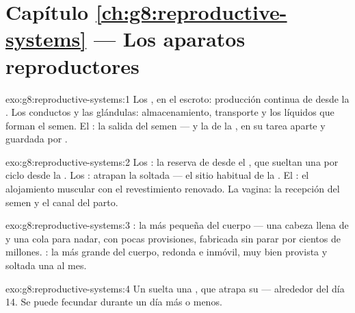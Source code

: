 \section*{Capítulo \ref{ch:g8:reproductive-systems} --- Los aparatos reproductores}

\begin{solution}{exo:g8:reproductive-systems:1}
Los , en el escroto: producción continua de 
desde la . Los conductos y las glándulas: almacenamiento,
transporte y los líquidos que forman el semen. El : la salida del
semen --- y la de la , en su tarea aparte y guardada por .
\end{solution}

\begin{solution}{exo:g8:reproductive-systems:2}
Los : la reserva de   desde el , que
sueltan una por ciclo desde la . Los : atrapan la
 soltada --- el sitio habitual de la . El : el
alojamiento muscular con el revestimiento renovado. La vagina: la
recepción del semen y el canal del parto.
\end{solution}

\begin{solution}{exo:g8:reproductive-systems:3}
: la  más pequeña del cuerpo --- una cabeza llena
de  y una cola para nadar, con pocas provisiones, fabricada sin
parar por cientos de millones.  : la más grande del
cuerpo, redonda e inmóvil, muy bien provista y soltada una al mes.
\end{solution}

\begin{solution}{exo:g8:reproductive-systems:4}
Un  suelta una  , que atrapa su  ---
alrededor del día 14. Se puede fecundar durante un día más o menos.
\end{solution}

